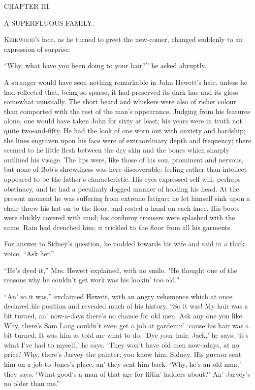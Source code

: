 {}

{CHAPTER III.}

A SUPERFLUOUS FAMILY.

\textsc{Kirkwood's} face, as he turned to greet the new-comer, changed
suddenly to an expression of surprise.

``Why, what have you been doing to your hair?'' he asked abruptly.

A stranger would have seen nothing remarkable in John Hewett's hair,
unless he had reflected that, being so sparse, it had preserved its dark
hue and its gloss somewhat unusually. The short beard and whiskers were
also of richer colour than comported with the rest of the man's
appearance. Judging from his features alone, one would have taken John
for sixty at least; his years were in truth not quite two-and-fifty. He
had the look of one worn out with anxiety {}and hardship; the lines
engraven upon his face were of extraordinary depth and frequency; there
seemed to he little flesh between the dry skin and the bones which
sharply outlined his visage. The lips were, like those of his son,
prominent and nervous, but none of Bob's shrewdness was here
discoverable; feeling rather than intellect appeared to be the father's
characteristic. His eyes expressed self-will, perhaps obstinacy, and he
had a peculiarly dogged manner of holding his head. At the present
moment he was suffering from extreme fatigue; he let himself sink upon a
chair threw his hat on to the floor, and rested a hand on each knee. His
boots were thickly covered with mud; his corduroy trousers were splashed
with the same. Rain had drenched him; it trickled to the floor from all
his garments.

For answer to Sidney's question, he nodded towards his wife and said in
a thick voice, ``Ask her.''

``He's dyed it,'' Mrs. Hewett explained, with no smile. "He thought one
of the {}reasons why he couldn't get work was his lookin' too old."

``An' so it was,'' exclaimed Hewett, with an angry vehemence which at
once declared his position and revealed much of his history. ``So it
was! My hair was a bit turned, an' now-a-days there's no chance for old
men. Ask any one you like. Why, there's Sam Lang couldn't even get a job
at gardenin' `cause his hair was a bit turned. It was him as told me
what to do. 'Dye your hair, Jack,' he says; `it's what I've had to
myself,' he says. `They won't have old men now-adays, at no price.' Why,
there's Jarvey the painter; you know him, Sidney. His guvnor sent him on
a job to Jones's place, an' they sent him back. `Why, he's an old man,'
they says. `What good's a man of that age for liftin' ladders about?'
An' Jarvey's no older than me.''

